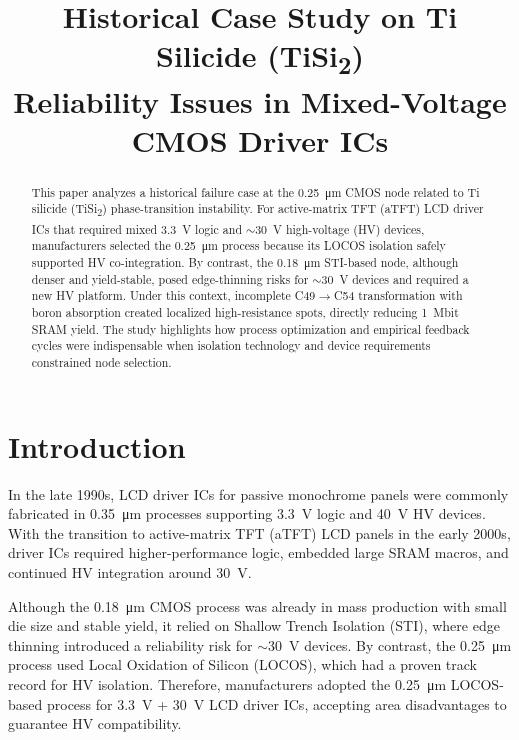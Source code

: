 \documentclass[conference]{IEEEtran}
\begin{document}
\title{Historical Case Study on Ti Silicide (TiSi\textsubscript{2}) \\ Reliability Issues in Mixed-Voltage CMOS Driver ICs}

\author{
}

\maketitle

\begin{abstract}
This paper analyzes a historical failure case at the \SI{0.25}{\micro\meter} CMOS node related to Ti silicide (TiSi\textsubscript{2}) phase-transition instability. 
For active-matrix TFT (aTFT) LCD driver ICs that required mixed \SI{3.3}{\volt} logic and $\sim$\SI{30}{\volt} high-voltage (HV) devices, manufacturers selected the \SI{0.25}{\micro\meter} process because its LOCOS isolation safely supported HV co-integration. 
By contrast, the \SI{0.18}{\micro\meter} STI-based node, although denser and yield-stable, posed edge-thinning risks for $\sim$\SI{30}{\volt} devices and required a new HV platform. 
Under this context, incomplete C49$\rightarrow$C54 transformation with boron absorption created localized high-resistance spots, directly reducing \SI{1}{Mbit} SRAM yield. 
The study highlights how process optimization and empirical feedback cycles were indispensable when isolation technology and device requirements constrained node selection.
\end{abstract}

\section{Introduction}
In the late 1990s, LCD driver ICs for passive monochrome panels were commonly fabricated in \SI{0.35}{\micro\meter} processes supporting \SI{3.3}{\volt} logic and \SI{40}{\volt} HV devices. 
With the transition to active-matrix TFT (aTFT) LCD panels in the early 2000s, driver ICs required higher-performance logic, embedded large SRAM macros, and continued HV integration around \SI{30}{\volt}.  

Although the \SI{0.18}{\micro\meter} CMOS process was already in mass production with small die size and stable yield, it relied on Shallow Trench Isolation (STI), where edge thinning introduced a reliability risk for $\sim$\SI{30}{\volt} devices. 
By contrast, the \SI{0.25}{\micro\meter} process used Local Oxidation of Silicon (LOCOS), which had a proven track record for HV isolation. 
Therefore, manufacturers adopted the \SI{0.25}{\micro\meter} LOCOS-based process for \SI{3.3}{\volt} + \SI{30}{\volt} LCD driver ICs, accepting area disadvantages to guarantee HV compatibility.
\end{document}
